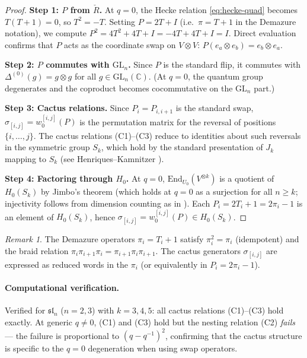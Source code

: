 \documentclass[11pt]{article}
\theoremstyle{remark}
\newtheorem{remark}[theorem]{Remark}
\newcommand{\CC}{\mathbb{C}}
\newcommand{\GL}{\mathrm{GL}}
\newcommand{\End}{\mathrm{End}}
\begin{document}
\begin{proof}
\textbf{Step 1: $P$ from $\check{R}$.}
At $q=0$, the Hecke relation \eqref{eq:hecke-quad} becomes $T(T+1) = 0$,
so $T^2 = -T$. Setting $P = 2T + I$ (i.e.\ $\pi = T + 1$ in the Demazure notation),
we compute $P^2 = 4T^2 + 4T + I = -4T + 4T + I = I$.
Direct evaluation confirms that $P$ acts as the coordinate swap on $V \otimes V$:
$P(e_a \otimes e_b) = e_b \otimes e_a$.

\textbf{Step 2: $P$ commutes with $\GL_n$.}
Since $P$ is the standard flip, it commutes with $\Delta^{(0)}(g) = g \otimes g$
for all $g \in \GL_n(\CC)$. (At $q=0$, the quantum group degenerates and the
coproduct becomes cocommutative on the $\GL_n$ part.)

\textbf{Step 3: Cactus relations.}
Since $P_i = P_{i,i+1}$ is the standard swap, $\sigma_{[i,j]} = w_0^{[i,j]}(P)$
is the permutation matrix for the reversal of positions $\{i,\ldots,j\}$.
The cactus relations (C1)--(C3) reduce to identities about such reversals
in the symmetric group $S_k$, which hold by the standard presentation of $J_k$
mapping to $S_k$ (see Henriques--Kamnitzer \cite{HK2006}).

\textbf{Step 4: Factoring through $H_0$.}
At $q=0$, $\End_{U_0}(V^{\otimes k})$ is a quotient of $H_0(S_k)$ by Jimbo's theorem
(which holds at $q=0$ as a surjection for all $n \ge k$; injectivity follows from
dimension counting as in \cite{jimbo1986}).
Each $P_i = 2T_i + 1 = 2\pi_i - 1$ is an element of $H_0(S_k)$,
hence $\sigma_{[i,j]} = w_0^{[i,j]}(P) \in H_0(S_k)$.
\end{proof}

\begin{remark}
The Demazure operators $\pi_i = T_i + 1$ satisfy $\pi_i^2 = \pi_i$
(idempotent) and the braid relation $\pi_i \pi_{i+1} \pi_i = \pi_{i+1} \pi_i \pi_{i+1}$.
The cactus generators $\sigma_{[i,j]}$ are expressed as reduced words in the
$\pi_i$ (or equivalently in $P_i = 2\pi_i - 1$).
\end{remark}

\paragraph{Computational verification.}
Verified for $\mathfrak{sl}_n$ ($n = 2, 3$) with $k = 3, 4, 5$:
all cactus relations (C1)--(C3) hold exactly.
At generic $q \ne 0$, (C1) and (C3) hold but the nesting relation (C2) \emph{fails}
--- the failure is proportional to $(q - q^{-1})^2$, confirming that the cactus structure
is specific to the $q = 0$ degeneration when using swap operators.
\end{document}

